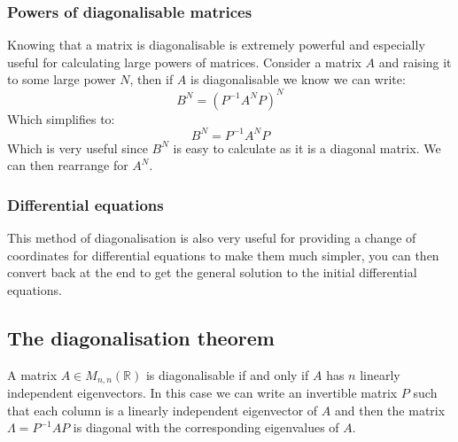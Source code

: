 \documentclass[12pt]{article}
\begin{document}
\subsubsection*{Powers of diagonalisable matrices}
Knowing that a matrix is diagonalisable is extremely powerful and especially useful for calculating large powers of matrices. Consider a matrix \(A\) and raising it to some large power \(N\), then if \(A\) is diagonalisable we know we can write:
\[B^N=(P^{-1}A^NP)^N\]
Which simplifies to:
\[B^N=P^{-1}A^NP\]
Which is very useful since \(B^N\) is easy to calculate as it is a diagonal matrix. We can then rearrange for \(A^N\).
\subsubsection*{Differential equations}
This method of diagonalisation is also very useful for providing a change of coordinates for differential equations to make them much simpler, you can then convert back at the end to get the general solution to the initial differential equations.
\subsection*{The diagonalisation theorem}
A matrix \(A\in M_{n,n}(\mathbb{R})\) is diagonalisable if and only if \(A\) has \(n\) linearly independent eigenvectors. In this case we can write an invertible matrix \(P\) such that each column is a linearly independent eigenvector of \(A\) and then the matrix \(\Lambda=P^{-1}AP\) is diagonal with the corresponding eigenvalues of \(A\).
\end{document}
